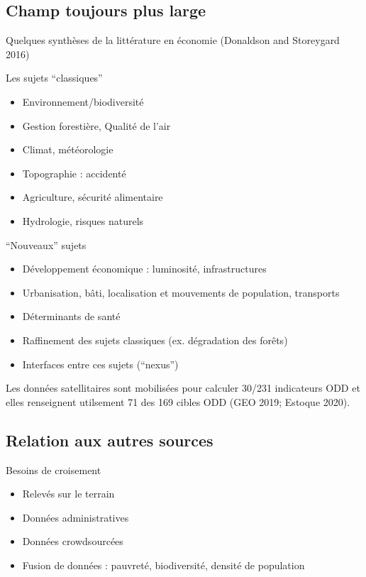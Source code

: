 \documentclass[
  letterpaper,
  DIV=11,
  numbers=noendperiod]{scrartcl}
\providecommand{\tightlist}{%
  \setlength{\itemsep}{0pt}\setlength{\parskip}{0pt}}\usepackage{longtable,booktabs,array}
\begin{document}
\hypertarget{champ-toujours-plus-large}{%
\subsection{Champ toujours plus large}\label{champ-toujours-plus-large}}

Quelques synthèses de la littérature en économie (Donaldson and
Storeygard 2016)

Les sujets ``classiques''

\begin{itemize}
\tightlist
\item
  Environnement/biodiversité
\item
  Gestion forestière, Qualité de l'air
\item
  Climat, météorologie
\item
  Topographie : accidenté
\item
  Agriculture, sécurité alimentaire
\item
  Hydrologie, risques naturels
\end{itemize}

``Nouveaux'' sujets

\begin{itemize}
\tightlist
\item
  Développement économique : luminosité, infrastructures
\item
  Urbanisation, bâti, localisation et mouvements de population,
  transports
\item
  Déterminants de santé
\item
  Raffinement des sujets classiques (ex. dégradation des forêts)
\item
  Interfaces entre ces sujets (``nexus'')
\end{itemize}

Les données satellitaires sont mobilisées pour calculer 30/231
indicateurs ODD et elles renseignent utilsement 71 des 169 cibles ODD
(GEO 2019; Estoque 2020).

\hypertarget{relation-aux-autres-sources}{%
\subsection{Relation aux autres
sources}\label{relation-aux-autres-sources}}

Besoins de croisement

\begin{itemize}
\tightlist
\item
  Relevés sur le terrain
\item
  Données administratives
\item
  Données crowdsourcées
\item
  Fusion de données : pauvreté, biodiversité, densité de population
\end{itemize}
\end{document}
